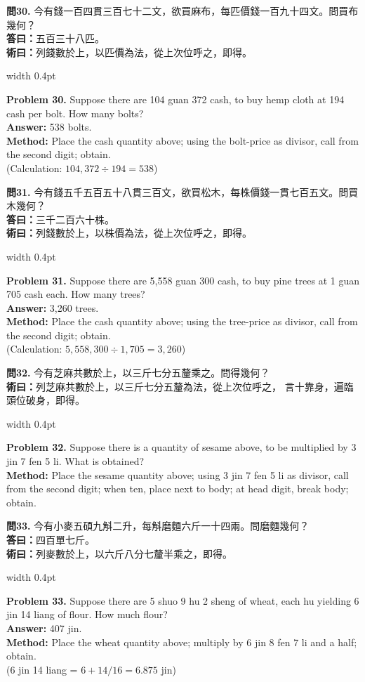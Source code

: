 \documentclass[10pt,a4paper]{article}
\newlength{\cnwidth}
\newlength{\enwidth}
\newcommand{\bilingual}[2]{%
  \noindent%
  \begin{minipage}[t]{\cnwidth}%
    #1%
  \end{minipage}%
  \hfill\vrule width 0.4pt\hfill%
  \begin{minipage}[t]{\enwidth}%
    #2%
  \end{minipage}%
  \par\smallskip%
}
\begin{document}
\bilingual{%
  \textbf{問30.}
  今有錢一百四貫三百七十二文，欲買麻布，每匹價錢一百九十四文。問買布幾何？\\
  \textbf{答曰：}五百三十八匹。\\
  \textbf{術曰：}列錢數於上，以匹價為法，從上次位呼之，即得。
}{%
  \textbf{Problem 30.}
  Suppose there are 104 guan 372 cash, to buy hemp cloth at 194 cash per bolt.
  How many bolts?\\
  \textbf{Answer:} 538 bolts.\\
  \textbf{Method:} Place the cash quantity above; using the bolt-price as divisor,
  call from the second digit; obtain.\\
  (Calculation: $104{,}372 \div 194 = 538$)
}

\bilingual{%
  \textbf{問31.}
  今有錢五千五百五十八貫三百文，欲買松木，每株價錢一貫七百五文。問買木幾何？\\
  \textbf{答曰：}三千二百六十株。\\
  \textbf{術曰：}列錢數於上，以株價為法，從上次位呼之，即得。
}{%
  \textbf{Problem 31.}
  Suppose there are 5,558 guan 300 cash, to buy pine trees at 1 guan 705 cash each.
  How many trees?\\
  \textbf{Answer:} 3,260 trees.\\
  \textbf{Method:} Place the cash quantity above; using the tree-price as divisor,
  call from the second digit; obtain.\\
  (Calculation: $5{,}558{,}300 \div 1{,}705 = 3{,}260$)
}

\bilingual{%
  \textbf{問32.}
  今有芝麻共數於上，以三斤七分五釐乘之。問得幾何？\\
  \textbf{術曰：}列芝麻共數於上，以三斤七分五釐為法，從上次位呼之，
  言十靠身，遍臨頭位破身，即得。
}{%
  \textbf{Problem 32.}
  Suppose there is a quantity of sesame above, to be multiplied by
  3 jin 7 fen 5 li. What is obtained?\\
  \textbf{Method:} Place the sesame quantity above; using 3 jin 7 fen 5 li as divisor,
  call from the second digit; when ten, place next to body; at head digit, break body; obtain.
}

\bilingual{%
  \textbf{問33.}
  今有小麥五碩九斛二升，每斛磨麵六斤一十四兩。問磨麵幾何？\\
  \textbf{答曰：}四百單七斤。\\
  \textbf{術曰：}列麥數於上，以六斤八分七釐半乘之，即得。
}{%
  \textbf{Problem 33.}
  Suppose there are 5 shuo 9 hu 2 sheng of wheat, each hu yielding
  6 jin 14 liang of flour. How much flour?\\
  \textbf{Answer:} 407 jin.\\
  \textbf{Method:} Place the wheat quantity above; multiply by 6 jin 8 fen 7 li
  and a half; obtain.\\
  (6 jin 14 liang = $6 + 14/16 = 6.875$ jin)
}
\end{document}
